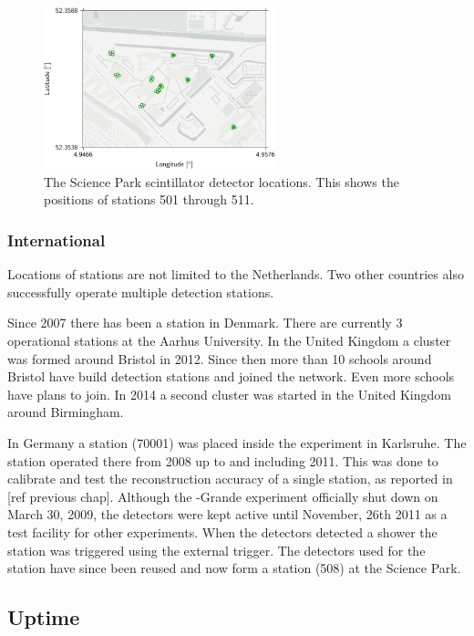 \begin{figure}
    \centering
    \includegraphics[width=0.6\textwidth]
                    {plots/cluster/subcluster_500}
    \caption{The Science Park scintillator detector locations. This shows the positions of stations 501 through 511.}
    \label{fig:subcluster_500}
\end{figure}


\subsubsection{International}

Locations of \hisparc stations are not limited to the Netherlands. Two other countries also successfully operate multiple detection stations.

Since 2007 there has been a \hisparc station in Denmark. There are currently 3 operational stations at the Aarhus University. In the United Kingdom a cluster was formed around Bristol in 2012. Since then more than 10 schools around Bristol have build detection stations and joined the network. Even more schools have plans to join. In 2014 a second cluster was started in the United Kingdom around Birmingham.

In Germany a station (70001) was placed inside the \kascade experiment in Karlsruhe. The station operated there from 2008 up to and including 2011. This was done to calibrate and test the reconstruction accuracy of a single \hisparc station, as reported in [ref previous chap]. Although the \kascade-Grande experiment officially shut down on March 30, 2009, the detectors were kept active until November, 26th 2011 as a test facility for other experiments. When the \kascade detectors detected a shower the \hisparc station was triggered using the external trigger. The detectors used for the \kascade station have since been reused and now form a station (508) at the Science Park.


\subsection{Uptime}

